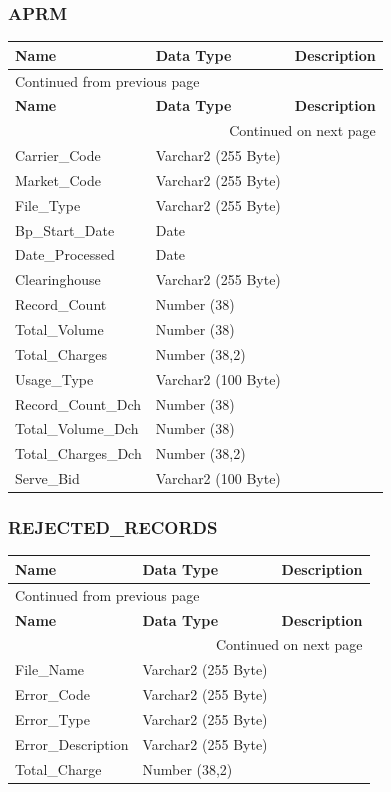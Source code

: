 \documentclass[12pt,twoside]{article}
\begin{document}
\normalsize
\subsubsection{APRM}
\label{sec:orgheadline160}
\footnotesize
\begin{longtable}{l|l|l}
\hline
\textbf{Name} & \textbf{Data Type} & \textbf{Description}\\
\hline
\endfirsthead
\multicolumn{3}{l}{Continued from previous page} \\
\hline

\textbf{Name} & \textbf{Data Type} & \textbf{Description} \\

\hline
\endhead
\hline\multicolumn{3}{r}{Continued on next page} \\
\endfoot
\endlastfoot
\hline
Carrier\_Code & Varchar2 (255 Byte) & \\
Market\_Code & Varchar2 (255 Byte) & \\
File\_Type & Varchar2 (255 Byte) & \\
Bp\_Start\_Date & Date & \\
Date\_Processed & Date & \\
Clearinghouse & Varchar2 (255 Byte) & \\
Record\_Count & Number (38) & \\
Total\_Volume & Number (38) & \\
Total\_Charges & Number (38,2) & \\
Usage\_Type & Varchar2 (100 Byte) & \\
Record\_Count\_Dch & Number (38) & \\
Total\_Volume\_Dch & Number (38) & \\
Total\_Charges\_Dch & Number (38,2) & \\
Serve\_Bid & Varchar2 (100 Byte) & \\
\hline
\end{longtable}
\normalsize
\newpage
\subsubsection{REJECTED\_RECORDS}
\label{sec:orgheadline161}
\footnotesize
\begin{longtable}{l|l|l}
\hline
\textbf{Name} & \textbf{Data Type} & \textbf{Description}\\
\hline
\endfirsthead
\multicolumn{3}{l}{Continued from previous page} \\
\hline

\textbf{Name} & \textbf{Data Type} & \textbf{Description} \\

\hline
\endhead
\hline\multicolumn{3}{r}{Continued on next page} \\
\endfoot
\endlastfoot
\hline
File\_Name & Varchar2 (255 Byte) & \\
Error\_Code & Varchar2 (255 Byte) & \\
Error\_Type & Varchar2 (255 Byte) & \\
Error\_Description & Varchar2 (255 Byte) & \\
Total\_Charge & Number (38,2) & \\
\hline
\end{longtable}
\normalsize
\end{document}
